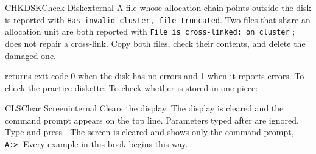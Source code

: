 \begin{DosEntry}{CHKDSK}{Check Disk}{external}
A file whose allocation chain points outside the disk is reported with
\texttt{Has invalid cluster, file truncated}.  Two files that share an
allocation unit are both reported with \texttt{File is cross-linked: on
cluster} ;  does not repair a cross-link.  Copy both
files, check their contents, and delete the damaged one.

 returns exit code 0 when the disk has no errors and 1 when it
reports errors.
\Example
To check the practice diskette:
To check whether  is stored in one piece:
\end{DosEntry}

\begin{DosEntry}{CLS}{Clear Screen}{internal}
\Purpose Clears the display.
\Format {}
\Remarks
The display is cleared and the command prompt appears on the top line.
Parameters typed after  are ignored.
\Example
Type  and press .  The screen is cleared and shows only
the command prompt, \texttt{A:\bs>}.  Every example in this book begins
this way.
\end{DosEntry}


